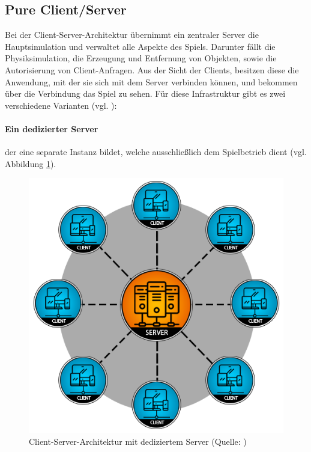 \subsection{Pure Client/Server}
Bei der Client-Server-Architektur übernimmt ein zentraler Server die Hauptsimulation und verwaltet alle Aspekte des Spiels. Darunter fällt die Physiksimulation, die Erzeugung und Entfernung von Objekten, sowie die Autorisierung von Client-Anfragen. Aus der Sicht der Clients, besitzen diese die Anwendung, mit der sie sich mit dem Server verbinden können, und bekommen über die Verbindung das Spiel zu sehen.
Für diese Infrastruktur gibt es zwei verschiedene Varianten (vgl. \cite{noauthor_client-server_2024}):
\paragraph{Ein dedizierter Server} der eine separate Instanz bildet, welche ausschließlich dem Spielbetrieb dient (vgl. Abbildung \ref{fig:dedicated_server}).

\begin{figure}[ht]
\centering
\includegraphics[width=1\linewidth]{content/pictures/ded_server-d5369721966357b9b4d5e1fa96b05b22.png}
\caption{Client-Server-Architektur mit dediziertem Server (Quelle: \cite{noauthor_network_2024})}
\label{fig:dedicated_server}
\end{figure}

